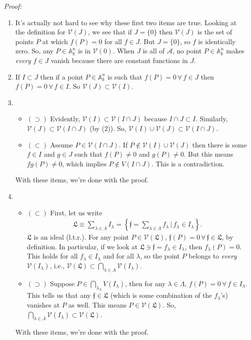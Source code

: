 \documentclass[12pt]{article}
\newcommand{\lc}{\left\{}
\newcommand{\rc}{\right\}}
\begin{document}
\noindent \textit{Proof:} 
\begin{enumerate}
	\item It's actually not hard to see why these first two items are  true. Looking at the definition for $\mathcal{V}(J)$, we see that if $J = \{0\}$ then $\mathcal{V}(J)$ is the set of points $P$ at which $f(P) = 0$ for all $f \in J$. But $J = \{0\}$, so $f$ is identically zero. So, any $P\in \mathbb{A}^n_k$ is in $\mathcal{V}(0)$. When $J$ is all of $\mathcal{A}$, no point $P \in \mathbb{A}^n_k$ makes \textit{every} $f \in J$ vanish because there are constant functions in $J$. 
	\item If $I \subset J$ then if a point $P\in \mathbb{A}^n_k$ is such that $f(P) = 0\,\forall\, f\in J$ then $f(P) = 0\,\forall \, f \in I$. So $\mathcal{V}(J) \subset \mathcal{V}(I)$.
	\item 
	\begin{itemize}
		\item $(\supset)$ Evidently, $\mathcal{V}(I) \subset \mathcal{V}(I \cap J)$ because $I \cap J \subset I$. Similarly, $\mathcal{V}(J) \subset \mathcal{V}(I \cap J)$ (by (2)). So, $\mathcal{V}(I) \cup \mathcal{V}(J) \subset \mathcal{V}(I \cap J)$.
		\item $(\subset)$ Assume $P \in \mathcal{V}(I \cap J)$. If $P \notin \mathcal{V}(I) \cup \mathcal{V}(J)$ then there is some $f\in I$ and $g \in J$ such that $f(P) \neq 0$ and $g(P) \neq 0$. But this means $fg(P) \neq 0$, which implies $P \notin V(I\cap J)$. This is a contradiction.
	\end{itemize}
	With these items, we're done with the proof. 
	\item \begin{itemize}
		\item $(\subset)$ First, let us write
		\begin{align*}
		\mathfrak{L} \equiv \sum_{\lambda \in \Lambda} I_\lambda  = \lc \mathfrak{f} =  \sum_{\lambda \in \Lambda} f_\lambda \,\bigg\vert\, f_\lambda \in I_\lambda \rc.
		\end{align*}
		$\mathfrak{L}$ is an ideal (l.t.r.). For any point $P \in \mathcal{V}(\mathfrak{L})$, $\mathfrak{f}(P) = 0\, \forall \, \mathfrak{f} \in \mathfrak{L}$, by definition. In particular, if we look at $\mathfrak{L} \ni \mathfrak{f} = f_\lambda \in I_\lambda $, then $f_\lambda(P) = 0$. This holds for all $f_\lambda \in I_\lambda$ and for all $\lambda$, so the point $P$ belongs to \textit{every} $\mathcal{V}(I_\lambda)$, i.e., $\mathcal{V}(\mathfrak{L}) \subset \bigcap_{\lambda\in \Lambda} \mathcal{V}(I_\lambda)$.   
		
		
		\item $(\supset)$ Suppose $P \in \bigcap_{\lambda_\Lambda} V(I_\lambda)$, then for any $\lambda \in \Lambda$, $f(P) = 0\, \forall \, f\in I_\lambda$. This tells us that any $\mathfrak{f} \in \mathfrak{L}$ (which is some combination of the $f_\lambda$'s) vanishes at $P$ as well. This means $P\in \mathcal{V}(\mathfrak{L})$. So, $\bigcap_{\lambda\in \Lambda}\mathcal{V}(I_\lambda) \subset \mathcal{V}(\mathfrak{L})$. 
	\end{itemize}
	With these items, we're done with the proof. 
\end{enumerate}
\end{document}
